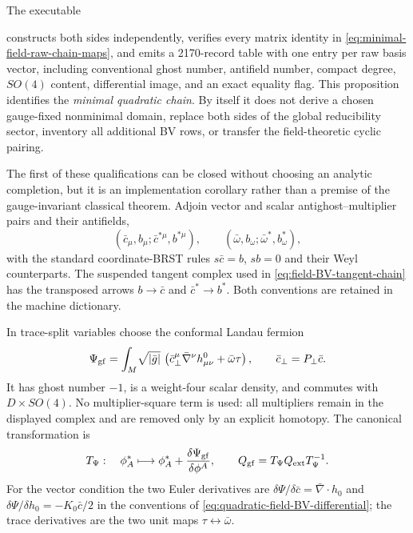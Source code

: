 \documentclass[11pt]{article}
\theoremstyle{definition}
\theoremstyle{remark}
\begin{document}
The executable
\begin{center}
\end{center}
constructs both sides independently, verifies every matrix identity in
\eqref{eq:minimal-field-raw-chain-maps}, and emits a 2170-record table with
one entry per raw basis vector, including conventional ghost number,
antifield number, compact degree, $SO(4)$ content, differential image, and
an exact equality flag.  This proposition identifies the \emph{minimal
quadratic chain}.  By itself it does not derive a chosen gauge-fixed nonminimal
domain, replace both sides of the global reducibility sector, inventory all
additional BV rows, or transfer the field-theoretic cyclic pairing.

The first of these qualifications can be closed without choosing an
analytic completion, but it is an implementation corollary rather than a
premise of the gauge-invariant classical theorem.  Adjoin vector and scalar antighost--multiplier pairs
and their antifields,
\begin{equation}
 (\bar c_\mu,b_\mu;\bar c^{*\mu},b^{*\mu}),\qquad
 (\bar\omega,b_\omega;\bar\omega^*,b_\omega^*),
\end{equation}
with the standard coordinate-BRST rules $s\bar c=b$, $sb=0$ and their Weyl
counterparts.  The suspended tangent complex used in
\eqref{eq:field-BV-tangent-chain} has the transposed arrows
$b\to\bar c$ and $\bar c^*\to b^*$.  Both conventions are retained in the
machine dictionary.

In trace-split variables choose the conformal Landau fermion
\begin{equation}\label{eq:cylinder-gauge-fermion}
 \Psi_{\rm gf}=\int_M\!\sqrt{|\bar g|}\,
 \left(\bar c_\perp^\mu\bar\nabla^\nu h^0_{\mu\nu}
       +\bar\omega\tau\right),
 \qquad \bar c_\perp=P_\perp\bar c .
\end{equation}
It has ghost number $-1$, is a weight-four scalar density, and commutes with
$D\times SO(4)$.  No multiplier-square term is used: all multipliers remain
in the displayed complex and are removed only by an explicit homotopy.  The
canonical transformation is
\begin{equation}
 T_\Psi:\quad
 \phi_A^*\longmapsto
 \phi_A^*+\frac{\delta\Psi_{\rm gf}}{\delta\phi^A},
 \qquad
 Q_{\rm gf}=T_\Psi Q_{\rm ext}T_\Psi^{-1}.
\end{equation}
For the vector condition the two Euler derivatives are
$\delta\Psi/\delta\bar c=\bar\nabla\!\cdot h_0$ and
$\delta\Psi/\delta h_0=-K_0\bar c/2$ in the conventions of
\eqref{eq:quadratic-field-BV-differential}; the trace derivatives are the
two unit maps $\tau\leftrightarrow\bar\omega$.
\end{document}
